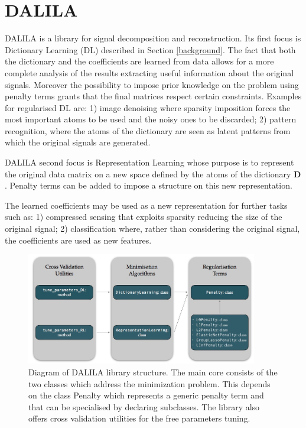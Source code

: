 \section{DALILA}\label{codesec}
DALILA is a library for signal decomposition and reconstruction. Its first focus is Dictionary Learning (DL) described in Section \ref{background}. The fact that both the dictionary and the coefficients are learned from data allows for a more complete analysis of the results  extracting useful information about the original signals. Moreover the possibility to impose prior knowledge on the problem using penalty terms grants that the final matrices respect certain constraints.
Examples for regularised DL are: 1) image denoising where sparsity imposition forces the most important atoms to be used and the noisy ones to be discarded; 2) pattern recognition, where the atoms of the dictionary are seen as latent patterns from which the original signals are generated.

DALILA second focus is Representation Learning whose purpose is to represent the original data matrix on a new space defined by the atoms of the dictionary $\mathbf{D}$. Penalty terms can be added to impose a structure on this new representation.

The learned coefficients may be used as a new representation for further tasks such as: 1) compressed sensing that exploits sparsity reducing the size of the original signal; 2) classification where, rather than considering the original signal, the coefficients are used as new features.

\begin{figure}[!h]
\centering
\includegraphics[width=0.9\textwidth]{schema}
\caption{Diagram of DALILA library structure.
The main core consists of the two classes which address the minimization problem.
This depends on the class Penalty which represents a generic penalty term and that can be specialised by declaring subclasses.
 The library also offers cross validation utilities for the free parameters tuning. }
\label{schema}
\end{figure}

